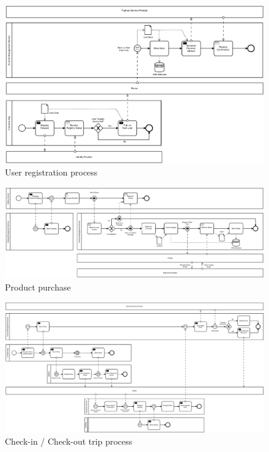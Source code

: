 \documentclass[runningheads,a4]{llncs}
\begin{document}
\begin{figure}
  \centering
  \includegraphics[width=.8\paperwidth]{img/new-user.png}
  \caption{User registration process}
  \label{fig:new-user}
\end{figure}
\begin{figure}
  \centering
  \includegraphics[width=.8\paperwidth]{img/purchase-product.png}
  \caption{Product purchase}
  \label{fig:purchase-product}
\end{figure}
\begin{figure}
  \centering
  \includegraphics[width=.8\paperwidth]{img/trip.png}
  \caption{Check-in / Check-out trip process}
  \label{fig:trip}
\end{figure}


\begin{acronym}
\end{acronym}
\end{document}
